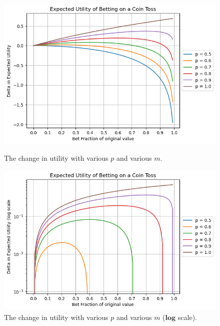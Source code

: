 \documentclass[13pt, reqno]{amsart}
\begin{document}
\begin{problem}[3]
\begin{figure}[H]
    \includegraphics[width=150mm]{output-linear.png}
    \caption{The change in utility with various $p$ and various $m$.}

    \medskip

    \includegraphics[width=150mm]{output-log.png}
    \caption{The change in utility with various $p$ and various $m$ ($\mathbf{log}$ scale).}


  \end{figure}

\end{problem}

\printbibliography
\end{document}
